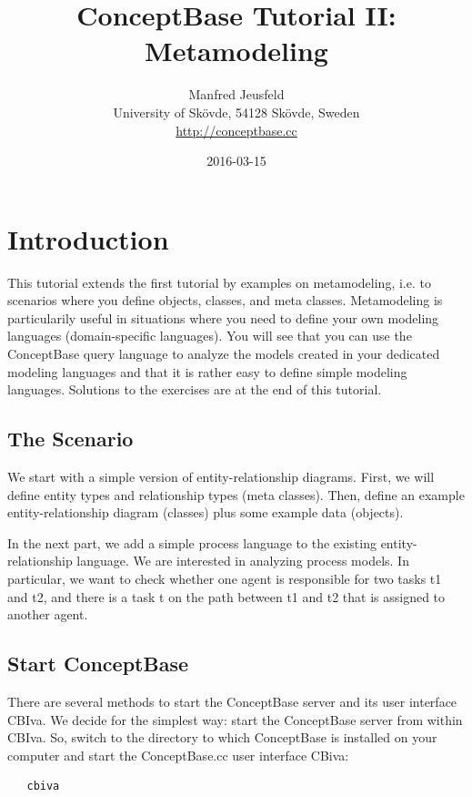 \documentclass[10pt,a4paper]{article}
\author{
Manfred Jeusfeld\\
{\small University of Sk\"ovde, 54128 Sk\"ovde, Sweden}\\
{\small \url{http://conceptbase.cc}}
}
\title{\bf ConceptBase Tutorial II: Metamodeling}
\date{2016-03-15}
\begin{document}
\maketitle

\section{Introduction}

This tutorial extends the first tutorial by examples on metamodeling, i.e.
to scenarios where you define objects, classes, and meta classes.
Metamodeling is particularily useful in situations where you need to 
define your own modeling languages (domain-specific languages). 
You will see that you can use the ConceptBase query language to analyze
the models created in your dedicated modeling languages and that it
is rather easy to define simple modeling languages.
Solutions to the exercises are at the end of this tutorial.


\subsection{ The Scenario }

We start with a simple version of entity-relationship diagrams. First, we
will define entity types and relationship types (meta classes). Then, define an example
entity-relationship diagram (classes) plus some example data (objects).

In the next part, we add a simple process language to the existing entity-relationship
language. We are interested in analyzing process models. In particular, we want to check
whether one agent is responsible for two tasks t1 and t2, and there is a task t on the
path between t1 and t2 that is assigned to another agent.



\subsection{Start ConceptBase}

There are several methods to start the ConceptBase server and its user interface CBIva.
We decide for the simplest way: start the ConceptBase server from within CBIva. 
So, switch to the directory to which ConceptBase is installed on your computer and
start the ConceptBase.cc user interface CBiva:
\begin{verbatim}
   cbiva
\end{verbatim}
\end{document}
